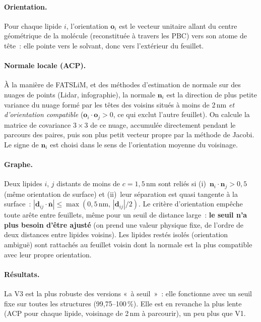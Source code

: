 \documentclass[11pt,a4paper]{article}
\begin{document}
\paragraph{Orientation.} Pour chaque lipide $i$, l'orientation $\mathbf o_i$ est le vecteur unitaire allant du
centre géométrique de la molécule (reconstituée à travers les PBC) vers son atome de tête~: elle pointe vers le
solvant, donc vers l'extérieur du feuillet.

\paragraph{Normale locale (ACP).} À la manière de FATSLiM, et des méthodes d'estimation de normale sur des nuages
de points (Lidar, infographie), la normale $\mathbf n_i$ est la direction de plus petite variance du nuage formé
par les têtes des voisins situés à moins de 2\,nm \emph{et d'orientation compatible}
($\mathbf o_i\cdot\mathbf o_j>0$, ce qui exclut l'autre feuillet). On calcule la matrice de covariance $3\times3$
de ce nuage, accumulée directement pendant le parcours des paires, puis son plus petit vecteur propre par la
méthode de Jacobi. Le signe de $\mathbf n_i$ est choisi dans le sens de l'orientation moyenne du voisinage.

\paragraph{Graphe.} Deux lipides $i$, $j$ distants de moins de $c=1{,}5$\,nm sont reliés si
(i)~$\mathbf n_i\cdot\mathbf n_j>0{,}5$ (même orientation de surface) et (ii)~leur séparation est quasi tangente à
la surface~: $|\mathbf d_{ij}\cdot\bar{\mathbf n}|\leq\max(0{,}5\,\text{nm},\,|\mathbf d_{ij}|/2)$. Le critère
d'orientation empêche toute arête entre feuillets, même pour un seuil de distance large~: \textbf{le seuil n'a plus
besoin d'être ajusté} (on prend une valeur physique fixe, de l'ordre de deux distances entre lipides voisins). Les
lipides restés isolés (orientation ambiguë) sont rattachés au feuillet voisin dont la normale est la plus
compatible avec leur propre orientation.

\paragraph{Résultats.} La V3 est la plus robuste des versions «~à seuil~»~: elle fonctionne avec un seuil fixe sur
toutes les structures (99,75--100\,\%). Elle est en revanche la plus lente (ACP pour chaque lipide, voisinage de
2\,nm à parcourir), un peu plus que V1.
\end{document}
